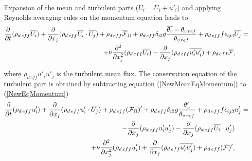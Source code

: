Expansion of the mean and turbulent parts ($U_i=\overline{U_i}+u'_i$) and
applying Reynolds averaging rules on the momentum equation leads to
\begin{eqnarray}
\label{NewMeanEqMomentum}
\dfrac{\partial}{\partial t}(\rho_{d\,eff} \overline{U_i})
+\dfrac{\partial}{\partial x_j} (\rho_{d\,eff} \overline{U_i} \cdot \overline{U_j} )
+ \rho_{d\,eff} \overline{\cal F}_{\Pi}
+ \rho_{d\,eff}  \delta_{i3} g \dfrac{\overline{\theta_v}-\theta_{v\,ref}}{\theta_{v\,ref}}
+ \rho_{d\,eff} f \epsilon_{ij3} \overline{U_j} = & \nonumber\\
+ \nu \dfrac{\partial^2}{\partial x_j^2} (\rho_{d\,eff} \overline{U_i}) -\dfrac{\partial}{\partial x_j} (\rho_{d\,eff} \overline{u'_i u'_j})               
+ \rho_{d\,eff} \overline{\cal F} , \qquad &
\end{eqnarray}

\noindent where $\rho_{d\,eff} \overline{u'_i u'_j}$ is the turbulent mean 
flux. The conservation equation of the turbulent part is obtained by 
subtracting equation (\ref{NewMeanEqMomentum}) to (\ref{NewEqMomentum})
\begin{eqnarray}
\label{NewTurbEqMomentum}
\dfrac{\partial}{\partial t}(\rho_{d\,eff} {u'_i})
+\dfrac{\partial}{\partial x_j} (\rho_{d\,eff} {u'_i} \cdot \overline{U_j} )
+ \rho_{d\,eff} ({\cal F}_{\Pi})'
+ \rho_{d\,eff}  \delta_{i3} g \dfrac{\theta'_v}{\theta_{v\,ref}}
+ \rho_{d\,eff} f \epsilon_{ij3} {u'_j} = 
 & \nonumber\\
- \dfrac{\partial}{\partial x_j} (\rho_{d\,eff} u'_i u'_j) 
- \dfrac{\partial}{\partial x_j} (\rho_{d\,eff} \overline{U_i} \cdot {u'_j} )
\qquad  & \nonumber\\
+ \nu \dfrac{\partial^2}{\partial x_j^2} (\rho_{d\,eff} {u'_i}) 
+ \dfrac{\partial}{\partial x_j} (\rho_{d\,eff} \overline{u'_i u'_j}) 
+ \rho_{d\,eff} ({\cal F})' , \qquad &
\end{eqnarray}

